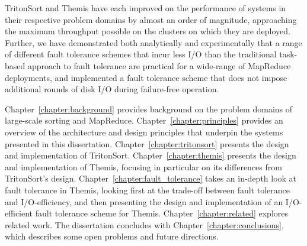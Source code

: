 TritonSort and Themis have each improved on the performance of systems in their
respective problem domains by almost an order of magnitude, approaching the
maximum throughput possible on the clusters on which they are
deployed. Further, we have demonstrated both analytically and experimentally
that a range of different fault tolerance schemes that incur less I/O than the
traditional task-based approach to fault tolerance are practical for a
wide-range of MapReduce deployments, and implemented a fault tolerance scheme
that does not impose additional rounds of disk I/O during failure-free
operation.

Chapter~\ref{chapter:background} provides background on the problem domains of
large-scale sorting and MapReduce. Chapter~\ref{chapter:principles} provides an
overview of the architecture and design principles that underpin the systems
presented in this dissertation. Chapter~\ref{chapter:tritonsort} presents the
design and implementation of TritonSort. Chapter~\ref{chapter:themis} presents
the design and implementation of Themis, focusing in particular on its
differences from TritonSort's design. Chapter~\ref{chapter:fault_tolerance}
takes an in-depth look at fault tolerance in Themis, looking first at the
trade-off between fault tolerance and I/O-efficiency, and then presenting the
design and implementation of an I/O-efficient fault tolerance scheme for
Themis. Chapter~\ref{chapter:related} explores related work.  The dissertation
concludes with Chapter~\ref{chapter:conclusions}, which describes some open
problems and future directions.
